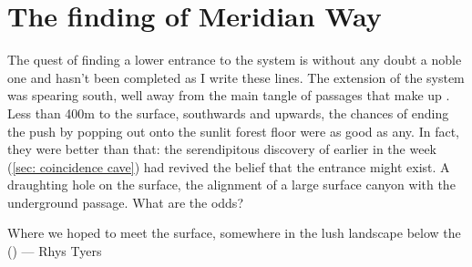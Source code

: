 \section{The finding of Meridian Way}
\begin{marginfigure}
\end{marginfigure}

The quest of finding a lower entrance to the system is without any doubt a noble one and hasn't been completed as I write these lines. The  extension of the system was spearing south, well away from the main tangle of passages that make up . Less than 400m to the surface, southwards and upwards, the chances of ending the push by popping out onto the sunlit forest floor were as good as any. In fact, they were better than that: the serendipitous discovery of  earlier in the week (\vref{sec: coincidence cave}) had revived the belief that the entrance might exist. A draughting hole on the surface, the alignment of a large surface canyon with the underground passage. What are the odds?

\begin{pagefigure}
\checkoddpage \ifoddpage \forcerectofloat \else \forceversofloat \fi
\centering
{}
\caption{Where we hoped to meet the surface, somewhere in the lush landscape below the \protect{} (\protect{}) --- Rhys Tyers}
\label{planina na kalu}
\end{pagefigure}

